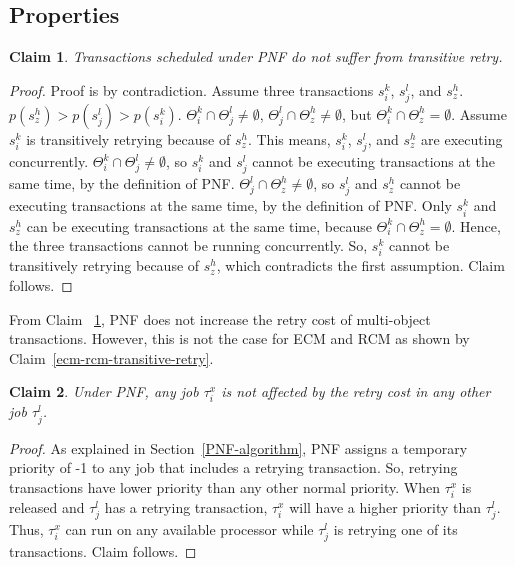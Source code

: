 \documentclass[twocolumn]{article}
\newtheorem{clm}{Claim}
\newtheorem{proof}{Proof}
\begin{document}
\subsection{Properties\label{pnf properties sec}}

\begin{clm}\label{PNF-transitive-retry}
Transactions scheduled under PNF do not suffer from transitive
retry.
\end{clm}
\begin{proof}\normalfont
Proof is by contradiction. Assume three transactions $s_i^k$, $s_j^l$, and $s_z^h$. $p(s_z^h)>p(s_j^l)>p(s_i^k)$. $\Theta_i^k \cap \Theta_j^l \neq \emptyset$, $\Theta_j^l \cap \Theta_z^h \neq \emptyset$, but $\Theta_i^k \cap \Theta_z^h = \emptyset$. Assume $s_i^k$ is transitively retrying because of $s_z^h$. This means, $s_i^k$, $s_j^l$, and $s_z^h$ are executing concurrently. $\Theta_i^k \cap \Theta_j^l \neq \emptyset$, so $s_i^k$ and $s_j^l$ cannot be executing transactions at the same time, by the definition of PNF. $\Theta_j^l \cap \Theta_z^h \neq \emptyset$, so $s_j^l$ and $s_z^h$ cannot be executing transactions at the same time, by the definition of PNF. Only $s_i^k$ and $s_z^h$ can be executing transactions at the same time,  because $\Theta_i^k \cap \Theta_z^h = \emptyset$. Hence, the three transactions cannot be running concurrently. So, $s_i^k$ cannot be transitively retrying because of $s_z^h$, which contradicts the first assumption. Claim follows.
\end{proof}

From Claim~ \ref{PNF-transitive-retry},
 PNF does not increase the retry cost of multi-object transactions. However, this is not the case for ECM and RCM as shown by Claim~\ref{ecm-rcm-transitive-retry}. 

\begin{clm}\label{higher retry does not affect response}
Under PNF, any job $\tau_{i}^{x}$ is not affected by the retry cost in any other
job $\tau_{j}^{l}$.
\end{clm}
\begin{proof}\normalfont
As explained in Section~\ref{PNF-algorithm}, PNF assigns a temporary priority of -1 to any job that includes a retrying transaction. So, retrying transactions have lower priority than any other normal priority.
When $\tau_{i}^{x}$ is released and $\tau_j^l$ has a retrying transaction, $\tau_i^x$ will have a higher priority
than $\tau_j^l$. Thus, $\tau_i^x$ can run on any available processor while $\tau_j^l$ is retrying one of its transactions. Claim follows.
\end{proof}
\end{document}
